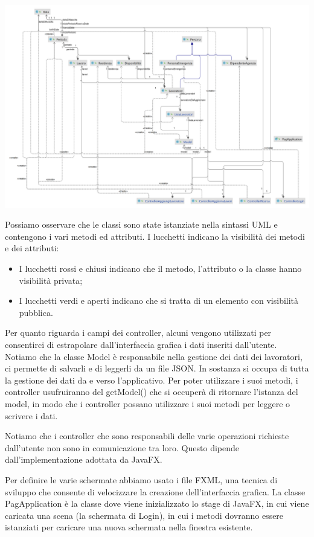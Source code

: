 \documentclass{article}
\begin{document}
     \includegraphics[width=\linewidth]{java.png}

    


Possiamo osservare che le classi sono state istanziate nella sintassi UML e contengono i vari metodi ed attributi. I lucchetti indicano la visibilità dei metodi e dei attributi:
\begin{itemize}
\item I lucchetti rossi e chiusi indicano che il metodo, l'attributo o la classe hanno visibilità privata;
\item I lucchetti verdi e aperti indicano che si tratta di un elemento con visibilità pubblica.
\end{itemize}

Per quanto riguarda i campi dei controller, alcuni vengono utilizzati per consentirci di estrapolare dall'interfaccia grafica i dati inseriti dall'utente.
Notiamo che la classe Model è responsabile nella gestione dei dati dei lavoratori, ci permette di salvarli e di leggerli da un file JSON. In sostanza si occupa di tutta la gestione dei dati da e verso l'applicativo. Per poter utilizzare i suoi metodi, i controller usufruiranno del getModel() che si occuperà di ritornare l'istanza del model, in modo che i controller possano utilizzare i suoi metodi per leggere o scrivere i dati.

Notiamo che i controller che sono responsabili delle varie operazioni richieste dall'utente non sono in comunicazione tra loro. Questo dipende dall’implementazione adottata da JavaFX.

Per definire le varie schermate abbiamo usato i file FXML, una tecnica di sviluppo che consente di velocizzare la creazione dell’interfaccia grafica. 
La classe PagApplication è la classe dove viene inizializzato lo stage di JavaFX, in cui viene caricata una scena (la schermata di Login),
in cui i metodi dovranno essere istanziati per caricare una nuova schermata nella finestra esistente.
\end{document}
